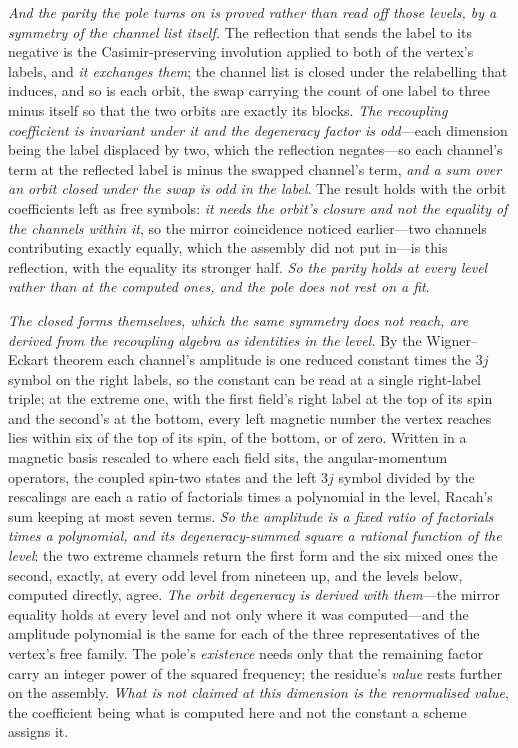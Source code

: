 \documentclass[11pt,a4paper]{article}
\theoremstyle{plain}
\theoremstyle{definition}
\theoremstyle{remark}
\begin{document}
\emph{And the parity the pole turns on is proved rather than read off those levels, by a symmetry of the channel
list itself.} The reflection that sends the label to its negative is the Casimir-preserving involution applied to
both of the vertex's labels, and \emph{it exchanges them}; the channel list is closed under the relabelling that
induces, and so is each orbit, the swap carrying the count of one label to three minus itself so that the two
orbits are exactly its blocks. \emph{The recoupling coefficient is invariant under it and the degeneracy factor is
odd}---each dimension being the label displaced by two, which the reflection negates---so each channel's term at
the reflected label is minus the swapped channel's term, \emph{and a sum over an orbit closed under the swap is odd
in the label}. The result holds with the orbit coefficients left as free symbols: \emph{it needs the orbit's
closure and not the equality of the channels within it}, so the mirror coincidence noticed earlier---two channels
contributing exactly equally, which the assembly did not put in---is this reflection, with the equality its
stronger half. \emph{So the parity holds at every level rather than at the computed ones, and the pole does not
rest on a fit}.

\emph{The closed forms themselves, which the same symmetry does not reach, are derived from the recoupling
algebra as identities in the level.} By the Wigner--Eckart theorem each channel's amplitude is one reduced
constant times the $3j$ symbol on the right labels, so the constant can be read at a single right-label triple;
at the extreme one, with the first field's right label at the top of its spin and the second's at the bottom,
every left magnetic number the vertex reaches lies within six of the top of its spin, of the bottom, or of zero.
Written in a magnetic basis rescaled to where each field sits, the angular-momentum operators, the coupled
spin-two states and the left $3j$ symbol divided by the rescalings are each a ratio of factorials times a
polynomial in the level, Racah's sum keeping at most seven terms. \emph{So the amplitude is a fixed ratio of
factorials times a polynomial, and its degeneracy-summed square a rational function of the level}: the two
extreme channels return the first form and the six mixed ones the second, exactly, at every odd level from
nineteen up, and the levels below, computed directly, agree. \emph{The orbit degeneracy is derived with them}---the
mirror equality holds at every level and not only where it was computed---and the amplitude polynomial is the same
for each of the three representatives of the vertex's free
family. The pole's \emph{existence} needs only that the remaining factor carry an integer power of the squared
frequency; the residue's \emph{value} rests further on the assembly. \emph{What is not claimed at this dimension is
the renormalised value}, the coefficient being what is computed here and not the constant a scheme assigns it.
\end{document}
